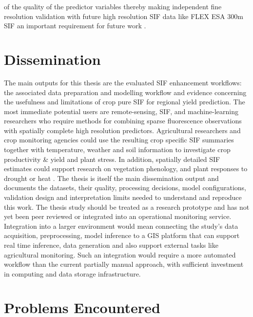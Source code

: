 of the quality of the predictor variables thereby making independent fine resolution validation with future high resolution SIF data like FLEX ESA 300m SIF an important requirement for future work \cite{chen2025improved,zhang2023generating}. 

\section{Dissemination\label{sec:dissemination}}

The main outputs for this thesis are the evaluated SIF enhancement workflows: the associated data preparation and modelling workflow and evidence concerning the usefulness and limitations of crop pure SIF for regional yield prediction. The most immediate potential users are remote-sensing, SIF, and machine-learning researchers who require methods for combining sparse fluorescence observations with spatially complete high resolution predictors. Agricultural researchers and crop monitoring agencies could use the resulting crop specific SIF summaries together with temperature, weather and soil information to investigate crop productivity \& yield and plant stress.  In addition, spatially detailed SIF estimates could support research on vegetation phenology, and plant responses to drought or heat \cite{qiu2022monitoring,song2018satellite,peng2020assessing}. The thesis is itself the main dissemination output and documents the datasets, their quality, processing decisions, model configurations, validation design and interpretation limits needed to understand and reproduce this work. The thesis study should be treated as a research prototype and has not yet been peer reviewed or integrated into an operational monitoring service. Integration into a larger environment would mean connecting the study's data acquisition, preprocessing, model inference to a GIS platform that can support real time inference, data generation and also support external tasks like agricultural monitoring. Such an integration would require a more automated workflow than the current partially manual approach, with sufficient investment in computing and data storage infrastructure.

\section{Problems Encountered\label{sec:problems}}

